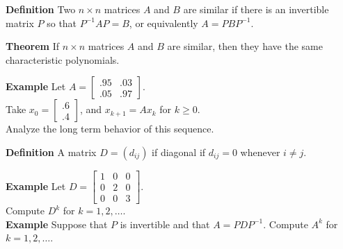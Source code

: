  \begin{frame}[fragile]
\textbf{Definition}
Two $n\times n$ matrices $A$ and $B$ are similar if there is an invertible matrix
$P$ so that $P^{-1}AP=B$, or equivalently $A=PBP^{-1}$.   
 

\textbf{Theorem}
If $n\times n$ matrices $A$ and $B$ are similar, then they have the same characteristic
polynomials.
 
%


\textbf{Example}
Let $A=\left[ \begin{array}{rr} .95& .03 \\ .05& .97\end{array}\right]$.  \\ 
Take $x_0=\left[\begin{array}{r} .6\\ .4\end{array}\right]$, and $x_{k+1}=Ax_k$ for $k\ge 0$.  \\ 
Analyze the long term behavior of this sequence.

\end{frame}



 \begin{frame}[fragile]
\textbf{Definition}
A matrix $D=(d_{i j})$ if diagonal if $d_{i j}=0$ whenever $i\neq j$. 

\textbf{Example}
Let $D=\left[ \begin{array}{rrr} 1&0&0\\ 0&2&0\\ 0&0&3\end{array}\right]$.  \\ 
Compute $D^k$ for $k=1,2,\dots$.  \\ 
 
\textbf{Example}
Suppose that $P$ is invertible and that $A=PDP^{-1}$.  Compute $A^k$ for $k=1,2,\dots$.

\end{frame}






